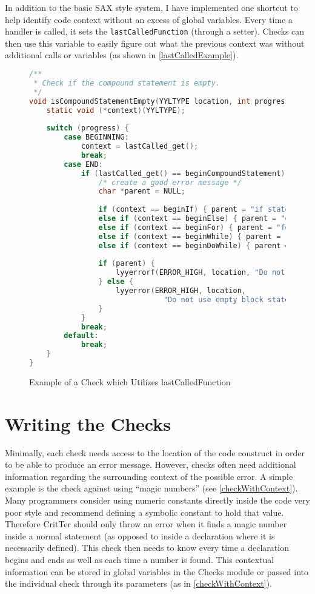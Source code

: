 \documentclass[12pt]{report}
\newcommand{\programName}{CritTer\xspace}
\begin{document}
In addition to the basic SAX style system, I have implemented one shortcut to help identify code context 
without an excess of global variables. Every time a handler is called, it sets the 
\lstinline{lastCalledFunction} (through a setter). Checks can then use this variable to easily figure out 
what the previous context was without additional calls or variables (as shown in 
\autoref{lastCalledExample}).

\begin{figure}
\begin{lstlisting}[language=C]
/**
 * Check if the compound statement is empty.
 */
void isCompoundStatementEmpty(YYLTYPE location, int progress) {
	static void (*context)(YYLTYPE);
	
	switch (progress) {
		case BEGINNING:
			context = lastCalled_get();
			break;
		case END:
			if (lastCalled_get() == beginCompoundStatement) {
				/* create a good error message */
				char *parent = NULL;
				
				if (context == beginIf) { parent = "if statements"; }
				else if (context == beginElse) { parent = "else statements"; }
				else if (context == beginFor) { parent = "for loops"; }
				else if (context == beginWhile) { parent = "while loops"; }
				else if (context == beginDoWhile) { parent = "doWhile loops"; }
				
				if (parent) {
					lyyerrorf(ERROR_HIGH, location, "Do not use empty %s", parent);
				} else {
					lyyerror(ERROR_HIGH, location, 
						       "Do not use empty block statements");
				}
			}
			break;
		default:
			break;
	}
}
\end{lstlisting}
\caption{Example of a Check which Utilizes lastCalledFunction}
\label{lastCalledExample}
\end{figure}
\newpage

\section{Writing the Checks}
\label{writingTheChecks}

Minimally, each check needs access to the location of the code construct in order to be able to produce 
an error message. However, checks often need additional information regarding the surrounding context 
of the possible error. A simple example is the check against using ``magic 
numbers''\cite[p.~19]{practice-of-programming} (see \autoref{checkWithContext}). Many programmers 
consider using numeric constants directly inside the code very poor style and recommend defining a 
symbolic constant to hold that value. Therefore \programName should only throw an error when it finds 
a magic number inside a normal statement (as opposed to inside a declaration where it is necessarily 
defined). This check then needs to know every time a declaration begins and ends as well as each time 
a number is found. This contextual information can be stored in global variables in the Checks module or passed into the individual check through its parameters (as in \autoref{checkWithContext}).
\end{document}
